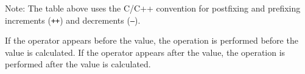 Note: The table above uses the C/C++ convention for postfixing and prefixing increments (\texttt{++}) and decrements (\texttt{--}).
\par If the operator appears before the value, the operation is performed before the value is calculated.
If the operator appears after the value, the operation is performed after the value is calculated.
